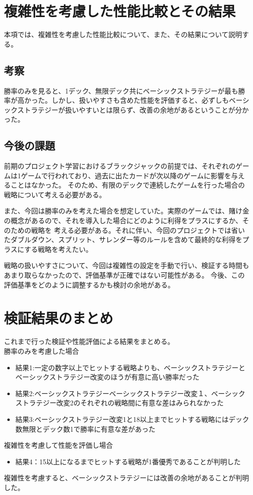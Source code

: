 \section{複雑性を考慮した性能比較とその結果}

本項では、複雑性を考慮した性能比較について、また、その結果について説明する。



\subsection{考察}

勝率のみを見ると、1デック、無限デック共にベーシックストラテジーが最も勝率が高かった。しかし、扱いやすさも含めた性能を評価すると、必ずしもベーシックストラテジーが扱いやすいとは限らず、改善の余地があるということが分かった。


\subsection{今後の課題}

前期のプロジェクト学習におけるブラックジャックの前提では、それぞれのゲームは1ゲームで行われており、過去に出たカードが次以降のゲームに影響を与えることはなかった。
そのため、有限のデックで連続したゲームを行った場合の戦略について考える必要がある。

また、今回は勝率のみを考えた場合を想定していた。実際のゲームでは、賭け金の概念があるので、それを導入した場合にどのように利得をプラスにするか、そのための戦略を
考える必要がある。それに伴い、今回のプロジェクトでは省いたダブルダウン、スプリット、サレンダー等のルールを含めて最終的な利得をプラスにする戦略を考えたい。

戦略の扱いやすさについて、今回は複雑性の設定を手動で行い、検証する時間もあまり取らなかったので、評価基準が正確ではない可能性がある。
今後、この評価基準をどのように調整するかも検討の余地がある。


\section{検証結果のまとめ}
これまで行った検証や性能評価による結果をまとめる。\\
勝率のみを考慮した場合
\begin{itemize}
\item 結果1:一定の数字以上でヒットする戦略よりも、ベーシックストラテジーとベーシックストラテジー改変のほうが有意に高い勝率だった
\item 結果2:ベーシックストラテジーベーシックストラテジー改変１、ベーシックストラテジー改変2のそれぞれの戦略間に有意な差はみられなかった
\item 結果3:ベーシックストラテジー改変1と18以上までヒットする戦略にはデック数無限とデック数1で勝率に有意な差があった
\end{itemize}
複雑性を考慮して性能を評価し場合
\begin{itemize}
\item 結果4：15以上になるまでヒットする戦略が1番優秀であることが判明した
\end{itemize}
複雑性を考慮すると、ベーシックストラテジーには改善の余地があることが判明した。